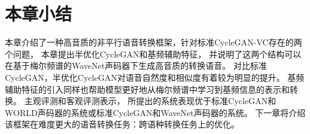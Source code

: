 \section{本章小结}

本章介绍了一种高音质的非平行语音转换框架，针对标准CycleGAN-VC存在的两个问题，
本章提出半优化CycleGAN和基频辅助特征，
并说明了这两个结构可以在基于梅尔频谱的WaveNet声码器下生成高音质的转换语音。
对比标准CycleGAN，半优化CycleGAN对语音自然度和相似度有着较为明显的提升。
基频辅助特征的引入同样也帮助模型更好地从梅尔频谱中学习到基频信息的表示和转换。
主观评测和客观评测表示，
所提出的系统表现优于标准CycleGAN和WORLD声码器的系统或标准CycleGAN和WaveNet声码器的系统。
下一章将介绍该框架在难度更大的语音转换任务：跨语种转换任务上的优化。

